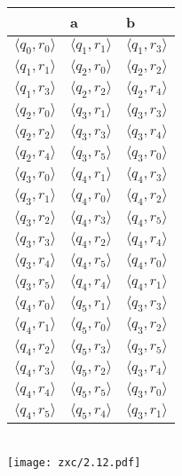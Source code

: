 \documentclass{article}
\begin{document}
			\begin{tabular}{ | l | l | l | }
				\hline
				& a & b \\ \hline
				$\langle q_0,r_0\rangle$ & $\langle q_1,r_1\rangle$ & $\langle q_1,r_3\rangle$ \\
				$\langle q_1,r_1\rangle$ & $\langle q_2,r_0\rangle$ & $\langle q_2,r_2\rangle$ \\
				$\langle q_1,r_3\rangle$ & $\langle q_2,r_2\rangle$ & $\langle q_2,r_4\rangle$ \\
				$\langle q_2,r_0\rangle$ & $\langle q_3,r_1\rangle$ & $\langle q_3,r_3\rangle$ \\
				$\langle q_2,r_2\rangle$ & $\langle q_3,r_3\rangle$ & $\langle q_3,r_4\rangle$ \\
				$\langle q_2,r_4\rangle$ & $\langle q_3,r_5\rangle$ & $\langle q_3,r_0\rangle$ \\
				$\langle q_3,r_0\rangle$ & $\langle q_4,r_1\rangle$ & $\langle q_4,r_3\rangle$ \\
				$\langle q_3,r_1\rangle$ & $\langle q_4,r_0\rangle$ & $\langle q_4,r_2\rangle$ \\
				$\langle q_3,r_2\rangle$ & $\langle q_4,r_3\rangle$ & $\langle q_4,r_5\rangle$ \\
				$\langle q_3,r_3\rangle$ & $\langle q_4,r_2\rangle$ & $\langle q_4,r_4\rangle$ \\
				$\langle q_3,r_4\rangle$ & $\langle q_4,r_5\rangle$ & $\langle q_4,r_0\rangle$ \\
				$\langle q_3,r_5\rangle$ & $\langle q_4,r_4\rangle$ & $\langle q_4,r_1\rangle$ \\
				$\langle q_4,r_0\rangle$ & $\langle q_5,r_1\rangle$ & $\langle q_3,r_3\rangle$ \\
				$\langle q_4,r_1\rangle$ & $\langle q_5,r_0\rangle$ & $\langle q_3,r_2\rangle$ \\
				$\langle q_4,r_2\rangle$ & $\langle q_5,r_3\rangle$ & $\langle q_3,r_5\rangle$ \\
				$\langle q_4,r_3\rangle$ & $\langle q_5,r_2\rangle$ & $\langle q_3,r_4\rangle$ \\
				$\langle q_4,r_4\rangle$ & $\langle q_5,r_5\rangle$ & $\langle q_3,r_0\rangle$ \\
				$\langle q_4,r_5\rangle$ & $\langle q_5,r_4\rangle$ & $\langle q_3,r_1\rangle$ \\
				\hline
			\end{tabular}\\
    \texttt{[image: zxc/2.12.pdf]}\\
\end{document}
